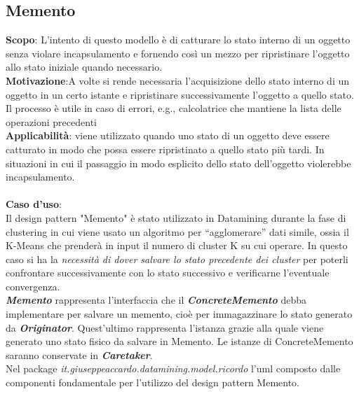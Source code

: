 \documentclass[a4paper, oneside]{book}
\begin{document}
\subsection*{Memento}
\textbf{Scopo}: L'intento di questo modello è di catturare lo stato interno di un oggetto senza violare
incapsulamento e fornendo così un mezzo per ripristinare l'oggetto allo stato iniziale
quando necessario.
\\
\textbf{Motivazione}:A volte si rende necessaria l'acquisizione dello stato interno di un oggetto in un certo
istante e ripristinare successivamente l'oggetto a quello stato. Il processo è utile in caso di errori,
e.g., calcolatrice che mantiene la lista delle operazioni precedenti
\\
\textbf{Applicabilità}:  viene utilizzato quando uno stato di un oggetto deve essere catturato in modo che
possa essere ripristinato a quello stato più tardi. In situazioni in cui il passaggio in modo esplicito dello stato dell'oggetto violerebbe incapsulamento.
\\
\\
\textbf{Caso d'uso}: 
\\
Il design pattern "Memento" è stato utilizzato in Datamining durante la fase di clustering in cui viene usato un algoritmo per “agglomerare” dati simile,
ossia il K-Means che prenderà in input il numero di cluster K su cui operare. In questo caso si ha la \textit{necessità di dover salvare lo stato precedente dei cluster} per poterli confrontare successivamente con lo stato successivo e verificarne l'eventuale convergenza.\\

\textbf{\textit{Memento}} rappresenta l'interfaccia che il \textbf{\textit{ConcreteMemento}} debba implementare
per salvare un memento, cioè per immagazzinare lo stato generato da \textbf{\textit{Originator}}.
Quest'ultimo rappresenta l'istanza grazie alla quale viene generato uno
stato fisico da salvare in Memento.
Le istanze di ConcreteMemento saranno conservate in \textbf{\textit{Caretaker}}.\\
Nel package \textit{it.giuseppeaccardo.datamining.model.ricordo} l'uml composto dalle componenti fondamentale per l'utilizzo del design
pattern Memento.\\
\end{document}
